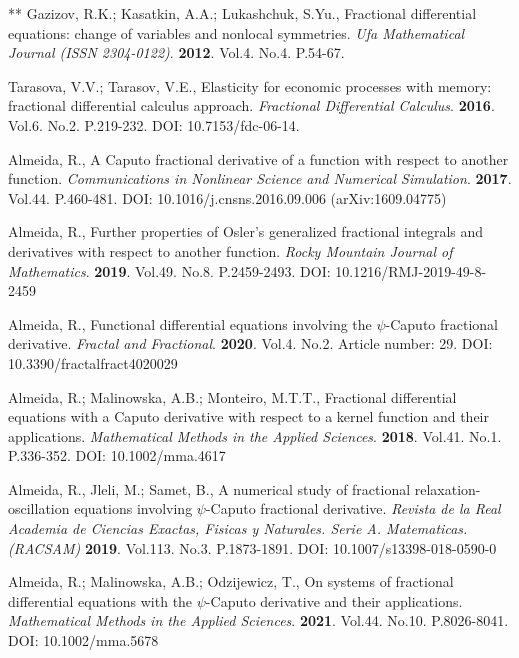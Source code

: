\documentclass[12pt]{article}
\begin{document}
\begin{thebibliography}{**}
Gazizov, R.K.; Kasatkin, A.A.; Lukashchuk, S.Yu.,
Fractional differential equations: change of variables and nonlocal symmetries.
\textit{Ufa Mathematical Journal (ISSN 2304-0122)}. 
\textbf{2012}. Vol.4. No.4. P.54-67.


 Tarasova, V.V.; Tarasov, V.E., 
Elasticity for economic processes with memory: fractional differential calculus approach. 
\textit{Fractional Differential Calculus}. 
\textbf{2016}. Vol.6. No.2. P.219-232. 
DOI: 10.7153/fdc-06-14.


 Almeida, R.,
A Caputo fractional derivative of a function with respect to another function.
\textit{Communications in Nonlinear Science and Numerical Simulation}.
\textbf{2017}. Vol.44. P.460-481.
DOI: 10.1016/j.cnsns.2016.09.006
(arXiv:1609.04775)

 Almeida, R., 
Further properties of Osler's generalized fractional integrals and derivatives with respect to another function.
\textit{Rocky Mountain Journal of Mathematics}. 
\textbf{2019}. Vol.49. No.8. P.2459-2493. 
DOI: 10.1216/RMJ-2019-49-8-2459 

 Almeida, R., 
Functional differential equations involving the $\psi$-Caputo fractional derivative.
\textit{Fractal and Fractional}. 
\textbf{2020}. Vol.4. No.2. Article number: 29. 
DOI: 10.3390/fractalfract4020029 

 Almeida, R.; Malinowska, A.B.; Monteiro, M.T.T., 
Fractional differential equations with a Caputo derivative with respect to a kernel function and their applications. 
\textit{Mathematical Methods in the Applied Sciences}.
\textbf{2018}. Vol.41. No.1. P.336-352. 
DOI: 10.1002/mma.4617

 Almeida, R., Jleli, M.; Samet, B.,
A numerical study of fractional relaxation-oscillation equations involving $\psi$-Caputo fractional derivative.
\textit{Revista de la Real Academia de Ciencias Exactas, Fisicas y Naturales. Serie A. Matematicas. (RACSAM)}
\textbf{2019}. Vol.113. No.3. P.1873-1891.
DOI: 10.1007/s13398-018-0590-0

Almeida, R.; Malinowska, A.B.; Odzijewicz, T.,
On systems of fractional differential equations with the $\psi$-Caputo derivative and their applications. 
\textit{Mathematical Methods in the Applied Sciences}.
\textbf{2021}. Vol.44. No.10. P.8026-8041. 
DOI: 10.1002/mma.5678


\end{thebibliography}
\end{document}
